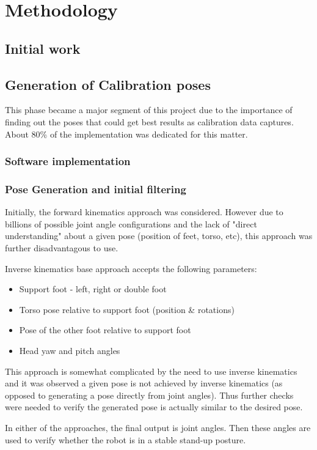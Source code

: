 \documentclass[english, printversion, nomenclature]{tuvisionthesis} %
\begin{document}
\chapter{Methodology}
\section{Initial work}
\section{Generation of Calibration poses}
This phase became a major segment of this project due to the importance of finding out the poses that could get best results as calibration data captures. About 80\% of the implementation was dedicated for this matter.

\subsection{Software implementation}
\subsection{Pose Generation and initial filtering}

Initially, the forward kinematics approach was considered. However due to billions of possible joint angle configurations and the lack of "direct understanding" about a given pose (position of feet, torso, etc), this approach was further disadvantagous to use.

Inverse kinematics base approach accepts the following parameters:
\begin{itemize}
	\item Support foot - left, right or double foot
	\item Torso pose relative to support foot (position \& rotations)
	\item Pose of the other foot relative to support foot
	\item Head yaw and pitch angles
\end{itemize}
This approach is somewhat complicated by the need to use inverse kinematics and it was observed a given pose is not achieved by inverse kinematics (as opposed to generating a pose directly from joint angles). Thus further checks were needed to verify the generated pose is actually similar to the desired pose.

In either of the approaches, the final output is joint angles. Then these angles are used to verify whether the robot is in a stable stand-up posture.
\end{document}
